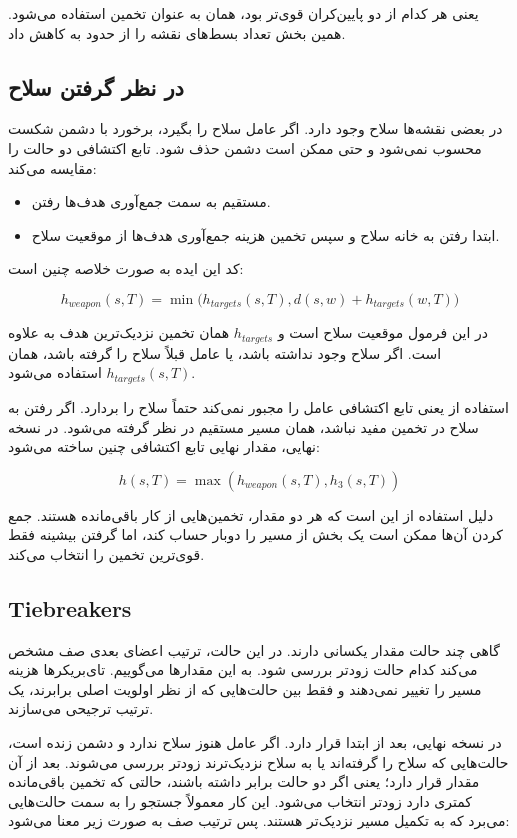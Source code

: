 \documentclass[10.5pt]{exam}
\begin{document}
یعنی هر کدام از دو پایین‌کران قوی‌تر بود، همان به عنوان تخمین استفاده می‌شود. همین بخش تعداد بسط‌های نقشه
را از حدود
به
کاهش داد.

\subsection{در نظر گرفتن سلاح}
در بعضی نقشه‌ها سلاح وجود دارد. اگر عامل سلاح را بگیرد، برخورد با دشمن شکست محسوب نمی‌شود و حتی ممکن است دشمن حذف شود. تابع اکتشافی دو حالت را مقایسه می‌کند:

\begin{itemize}
    \item مستقیم به سمت جمع‌آوری هدف‌ها رفتن.
    \item ابتدا رفتن به خانه سلاح و سپس تخمین هزینه جمع‌آوری هدف‌ها از موقعیت سلاح.
\end{itemize}

کد این ایده به صورت خلاصه چنین است:

\[
    h_{weapon}(s,T) =
    \min\Big(
        h_{targets}(s,T),
        d(s,w) + h_{targets}(w,T)
    \Big)
\]

در این فرمول
موقعیت سلاح است و
$h_{targets}$
همان تخمین نزدیک‌ترین هدف به علاوه
است. اگر سلاح وجود نداشته باشد، یا عامل قبلاً سلاح را گرفته باشد، همان
$h_{targets}(s,T)$
استفاده می‌شود.

استفاده از
یعنی تابع اکتشافی عامل را مجبور نمی‌کند حتماً سلاح را بردارد. اگر رفتن به سلاح در تخمین مفید نباشد، همان مسیر مستقیم در نظر گرفته می‌شود.
در نسخه نهایی، مقدار نهایی تابع اکتشافی چنین ساخته می‌شود:

\[
    h(s,T) = \max(h_{weapon}(s,T), h_3(s,T))
\]

دلیل استفاده از
این است که هر دو مقدار، تخمین‌هایی از کار باقی‌مانده هستند. جمع کردن آن‌ها ممکن است یک بخش از مسیر را دوبار حساب کند، اما گرفتن بیشینه فقط قوی‌ترین تخمین را انتخاب می‌کند.

\subsection{Tiebreakers}
گاهی چند حالت مقدار
یکسانی دارند. در این حالت، ترتیب اعضای بعدی صف مشخص می‌کند کدام حالت زودتر بررسی شود. به این مقدارها
می‌گوییم. تای‌بریکرها هزینه مسیر را تغییر نمی‌دهند و فقط بین حالت‌هایی که از نظر اولویت اصلی برابرند، یک ترتیب ترجیحی می‌سازند.

در نسخه نهایی، بعد از
ابتدا
قرار دارد. اگر عامل هنوز سلاح ندارد و دشمن زنده است، حالت‌هایی که سلاح را گرفته‌اند یا به سلاح نزدیک‌ترند زودتر بررسی می‌شوند. بعد از آن مقدار
قرار دارد؛ یعنی اگر دو حالت
برابر داشته باشند، حالتی که تخمین باقی‌مانده کمتری دارد زودتر انتخاب می‌شود. این کار معمولاً جستجو را به سمت حالت‌هایی می‌برد که به تکمیل مسیر نزدیک‌تر هستند.
پس ترتیب صف به صورت زیر معنا می‌شود:
\end{document}
